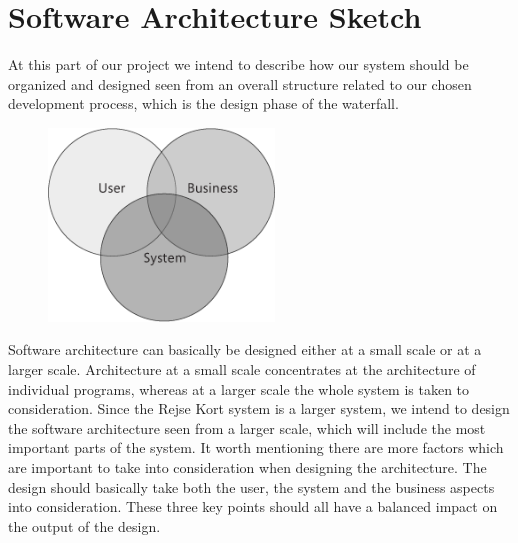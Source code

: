 \renewcommand{\headrulewidth}{0.1pt}
\renewcommand{\footrulewidth}{0.1pt}

\section*{Software Architecture Sketch}

At this part of our project we intend to describe how our system should be organized and designed seen from an overall structure related to our chosen development process, which is the design phase of the waterfall.

\begin{figure}[ht!]
\centering
\includegraphics[width=60mm]{graphics/SA_pic_1.png}
\label{asw}
\end{figure}

Software architecture can basically be designed either at a small scale or at a larger scale. Architecture at a small scale concentrates at the architecture of individual programs, whereas at a larger scale the whole system is taken to consideration. Since the Rejse Kort system is a larger system, we intend to design the software architecture seen from a larger scale, which will include the most important parts of the system. It worth mentioning there are more factors which are important to take into consideration when designing the architecture. The design should basically take both the user, the system and the business aspects into consideration. These three key points should all have a balanced impact on the output of the design. 

